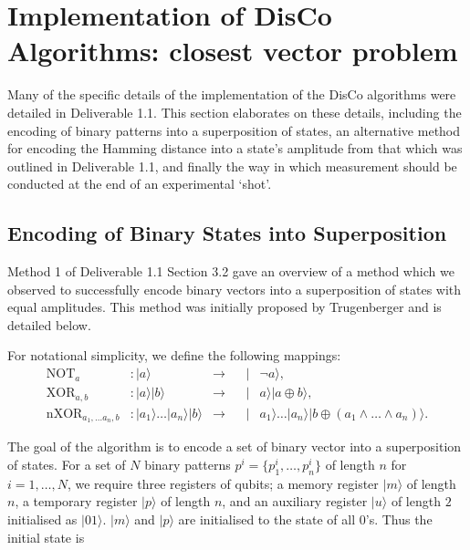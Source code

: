 \section{Implementation of DisCo Algorithms: closest vector problem}
\label{sec:implementation_of_closest_Vector_algorithms}
Many of the specific details of the implementation of the DisCo algorithms were detailed in Deliverable 1.1. This section elaborates on these details, including the encoding of binary patterns into a superposition of states, an alternative method for encoding the Hamming distance into a state's amplitude from that which was outlined in Deliverable 1.1, and finally the way in which measurement should be conducted at the end of an experimental `shot'.

\subsection{Encoding of Binary States into Superposition}
\label{sec:encoding_binary_states_superposition}
Method 1 of Deliverable 1.1 Section 3.2 gave an overview of a method which we observed to successfully encode binary vectors into a superposition of states with equal amplitudes. This method was initially proposed by Trugenberger \cite{Trugenberger_2001} and is detailed below.

For notational simplicity, we define the following mappings:
\begin{align}
    \textrm{NOT}_{a} &: \vert a \rangle & \rightarrow & & \vert& \lnot a \rangle, \\  
    \textrm{XOR}_{a,b} &: \vert a \rangle \vert b \rangle & \rightarrow & & \vert& a \rangle \vert a \oplus b \rangle, \\  
    \textrm{nXOR}_{a_{1},\dots a_{n} ,b} &: \vert a_1 \rangle \dots\vert a_{n} \rangle \vert b \rangle &\rightarrow & & \vert& a_1 \rangle \dots \vert a_{n} \rangle \vert b \oplus (a_{1} \wedge \dots \wedge a_{n}) \rangle  .
\end{align}

The goal of the algorithm is to encode a set of binary vector into a superposition of states. For a set of $N$ binary patterns $p^i = \{p_1^i, \dots, p_n^i \} $ of length $n$ for $i=1,\dots,N$, we require three registers of qubits; a memory register $\vert m \rangle$ of length $n$, a temporary register $\vert p \rangle$ of length $n$, and an auxiliary register $\vert u \rangle$ of length $2$ initialised as $\vert 01 \rangle$. $\vert m \rangle$ and $\vert p \rangle$ are initialised to the state of all $0$'s. Thus the initial state is

